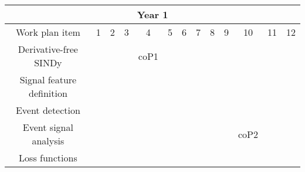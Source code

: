 \documentclass[a4paper,11pt]{scrartcl}
\begin{document}
\setlength\extrarowheight{3pt}
\begin{table}[h!]
    \centering
     \addtolength{\tabcolsep}{-3pt}
     \fontsize{10pt}{11pt}\selectfont
    \begin{tabular}{|c|c|c|c|c|c|c|c|c|c|c|c|c|}
    \hline
    \multicolumn{13}{|c|}{\cellcolor{gray!50} Year 1} \\
        \hline
        Work plan item & 1 & 2 & 3 & 4 & 5 & 6 & 7 & 8 & 9 & 10 & 11 & 12 \\
        \hline
        Derivative-free SINDy & \cellcolor{orange!25} & \cellcolor{orange!25} & \cellcolor{orange!25} & \cellcolor{orange!25} coP1 & & & & & & & & \\
        \hline
        Signal feature definition & & & & \cellcolor{blue!25} & \cellcolor{blue!25} & \cellcolor{blue!25} & \cellcolor{blue!25} & & & & & \\
        \hline
        Event detection & & & & & & \cellcolor{blue!25} & \cellcolor{blue!25} & \cellcolor{blue!25} & & & & \\
        \hline
        Event signal analysis & & & & & & & \cellcolor{blue!25} & \cellcolor{blue!25} & \cellcolor{blue!25} & \cellcolor{blue!25} coP2 & & \\
        \hline
        Loss functions & & & & & & & & & & \cellcolor{purple!25} & \cellcolor{purple!25} & \cellcolor{purple!25} \\
        

\end{tabular}
\end{table}
\end{document}
